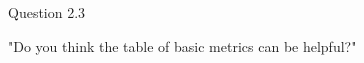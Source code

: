 \begin{shaded} Question 2.3 \end{shaded} \label{question:hybris_architecture/interview/question_2.3}
"Do you think the table of basic metrics can be helpful?"

